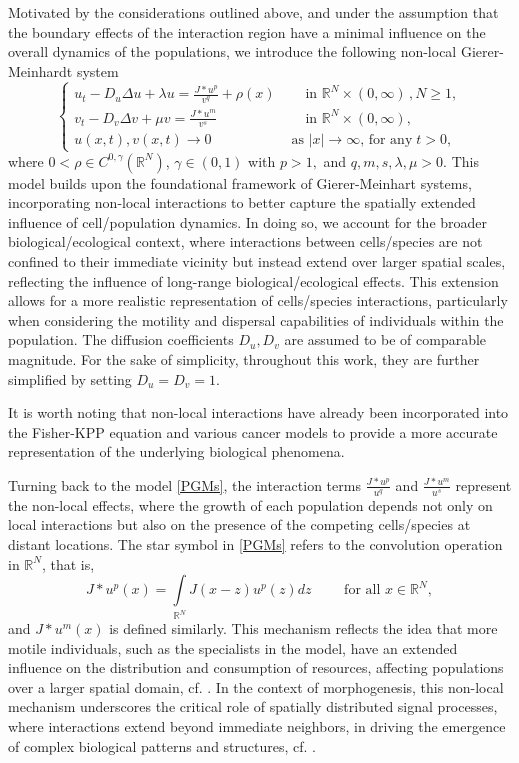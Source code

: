 \documentclass[leqno,12pt]{article}
\newcommand{\intl}{\int\limits}
\newcommand{\R}{\mathbb R}
\numberwithin{equation}{section}
\begin{document}
Motivated by the considerations outlined above, and under the assumption that the boundary effects of the interaction region have a minimal influence on the overall dynamics of the populations, we introduce the following non-local Gierer-Meinhardt system 
\begin{equation}\label{PGMs}
\begin{cases}
\displaystyle   u_t-D_u\Delta u+\lambda u=\frac{J * u^p}{v^q}+\rho(x) &\quad\mbox{ in }\R^N\times(0,\infty)\, , N\geq 1,\\[0.1in]
\displaystyle  v_t -D_v\Delta v+\mu v=\frac{J * u^m}{v^s} &\quad\mbox{ in }\R^N\times(0,\infty),\\[0.1in]
u(x,t), v(x,t)\to 0 &\mbox{ as }|x|\to \infty,\,\mbox{for any}\; t>0,
\end{cases}
\end{equation}
where $0<\rho\in C^{0,\gamma}(\R^N)$, $\gamma\in (0, 1)$  with $p>1,$ and $q,m,s,\lambda,\mu>0$.
This model builds upon the foundational framework of Gierer-Meinhart systems, incorporating non-local interactions to better capture the spatially extended influence of cell/population dynamics. In doing so, we account for the broader biological/ecological context, where interactions between cells/species are not confined to their immediate vicinity but instead extend over larger spatial scales, reflecting the influence of long-range biological/ecological effects. This extension allows for a more realistic representation of cells/species interactions, particularly when considering the motility and dispersal capabilities of individuals within the population.   The diffusion coefficients $D_u,D_v$ are assumed to be of comparable magnitude. For the sake of simplicity, throughout this work, they are further simplified by setting $D_u=D_v=1.$


It is worth noting that non-local interactions have already been incorporated into the Fisher-KPP equation \cite{L20} and various cancer models \cite{KLS23, L11, L13} to provide a more accurate representation of the underlying biological phenomena.

Turning back to the model \eqref{PGMs},  the interaction terms $\frac{J*u^p}{u^q}$ and $\frac{J*u^m}{u^s}$ represent the non-local effects, where the growth of each population depends not only on local interactions but also on the presence of the competing cells/species at distant locations. The star symbol in \eqref{PGMs} refers to the convolution operation in $\R^N$, that is,
$$
J*u^p(x)=\intl_{\R^N} J(x-z)u^p(z) dz
\quad
\quad\mbox{ for all }x\in \R^N,
$$
and $ J*u^m(x)$ is defined similarly. 
 This mechanism reflects the idea that more motile individuals, such as the specialists in the model, have an extended influence on the distribution and consumption of resources, affecting populations over a larger spatial domain, cf. \cite{BaylissVolpert2015_CompetingPopulationsnon-local}. In the context of morphogenesis, this non-local mechanism underscores the critical role of spatially distributed signal processes, where interactions extend beyond immediate neighbors, in driving the emergence of complex biological patterns and structures, cf. \cite{KS18}.
\end{document}
